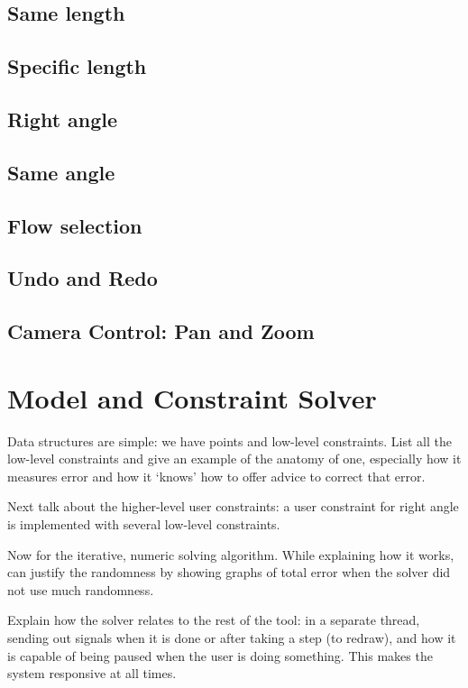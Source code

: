 \subsection{Same length}

\subsection{Specific length}

\subsection{Right angle}

\subsection{Same angle}

\subsection{Flow selection}

\subsection{Undo and Redo}

\subsection{Camera Control: Pan and Zoom}

\section{Model and Constraint Solver}

Data structures are simple: we have points and low-level
constraints. List all the low-level constraints and give an example of
the anatomy of one, especially how it measures error and how it
`knows' how to offer advice to correct that error.

Next talk about the higher-level user constraints: a user constraint
for right angle is implemented with several low-level constraints. 

Now for the iterative, numeric solving algorithm. While explaining how
it works, can justify the randomness by showing graphs of total error
when the solver did not use much randomness.

Explain how the solver relates to the rest of the tool: in a separate
thread, sending out signals when it is done or after taking a step (to
redraw), and how it is capable of being paused when the user is doing
something. This makes the system responsive at all times.
